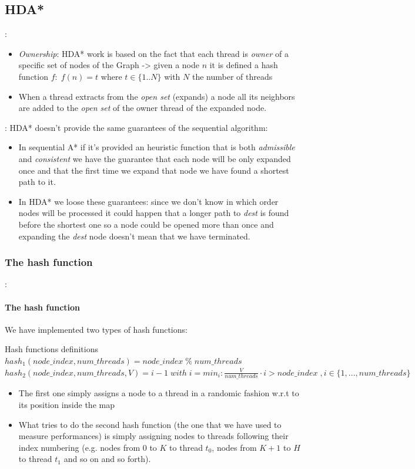 \documentclass[12pt]{beamer}
\begin{document}
	\subsection{HDA*}
	\begin{frame}{\secname : \subsecname}
		\begin{itemize}
			\item \textit{Ownership}: HDA* work is based on the fact that each thread is \textit{owner} of a
				  specific set of nodes of the Graph -> given a node $n$ it is defined a hash function $f:\;f(n) = t$
				  where $t \in \{1..N\}$ with $N$ the number of threads
			\item When a thread extracts from the \textit{open set}
			      (expands) a node all its neighbors are added to the \textit{open set} of the owner thread of the expanded node.
		\end{itemize}
	\end{frame}
	\begin{frame}{\secname : \subsecname}
		HDA* doesn't provide the same guarantees of the sequential algorithm:
		\begin{itemize}
		\item   In sequential A* if it's provided an heuristic function that is both \textit{admissible}
				and \textit{consistent} we have the guarantee that each node will be only expanded once
				and that the first time we expand that node we have found a shortest path to it.
		\item   In HDA* we loose these guarantees: since we don't know in which order nodes will be processed
				it could happen that a longer path to \textit{dest} is found before the shortest one so
				a node could be opened more than once and expanding the \textit{dest} node doesn't
				mean that we have terminated.
		\end{itemize}
	\end{frame}
	\subsubsection{The hash function}
	\begin{frame}{\secname : \subsecname}
		\framesubtitle{The hash function} 
		We have implemented two types of hash functions:
		\begin{block}{Hash functions definitions}
			$hash_1(node\_index, num\_threads) = node\_index \;\%\; num\_threads$
			$hash_2(node\_index, num\_threads, V) = i-1 \;with\;
			i = min_i : \frac{V}{num\_threads}\cdot i > node\_index \;, i \in \{1,...,num\_threads\}$
		\end{block}
		\begin{itemize}
			\item The first one simply assigns a node to a thread in a randomic fashion w.r.t to its position
				  inside the map
			\item What tries to do the second hash function (the one that we have used to 
				  measure performances) is simply assigning nodes to threads following their index
				  numbering (e.g. nodes from $0$ to $K$ to thread $t_0$, nodes from
				  $K+1$ to $H$ to thread $t_1$ and so on and so forth).
		\end{itemize}
	\end{frame}
\end{document}
